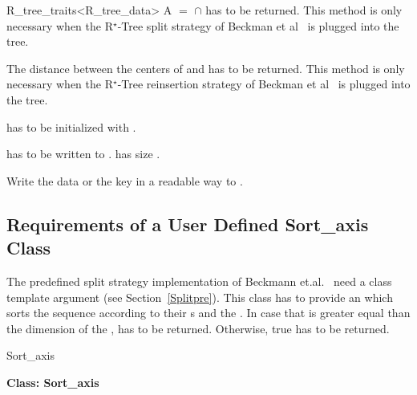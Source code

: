 \begin{ccClassTemplate}{R_tree_traits<R_tree_data>}
{A $=$  $\cap$  has to be returned.
 This method is only
  necessary when the R$^\star$-Tree split strategy of Beckman et
  al~\cite{bkss-rtera-90} is plugged into the tree.}

{The distance between the centers of  and  has to
  be returned.
This method is only
  necessary when the R$^\star$-Tree reinsertion strategy of Beckman et
  al~\cite{bkss-rtera-90} is plugged into the tree.}

{ has to be initialized with .}

{ has to be  written to .  has size .}

{Write the data or the key in a readable way to .}

\end{ccClassTemplate}
\subsection{Requirements of a User Defined Sort\_axis Class}
\label{Sortuser}
The predefined split strategy implementation of
Beckmann et.al.~\cite{bkss-rtera-90} need a 
 class template argument (see Section~\ref{Splitpre}). This class has to
provide  an  which sorts the
sequence \ccc{[first,last[} according to their s and the
. In
case that  is greater equal than the dimension of
the ,  has to be  returned. Otherwise, true
has to be returned.


\begin{ccClass}{Sort_axis}

\noindent
{\bf Class: Sort\_axis}


\ccOperations
{}
\end{ccClass}


